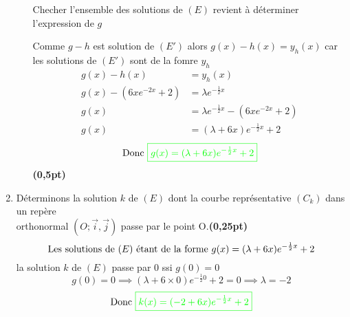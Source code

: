 \documentclass[12pt]{article}
\begin{document}
\begin{enumerate}[label=\arabic*)]
\begin{enumerate}[label=\alph*)]
Checher l'ensemble des solutions de \( (E) \) revient à déterminer l'expression de \( g \)

Comme \( g-h \) est solution  de \( (E') \) alors \( g(x)-h(x)= y_{h}(x) \) car les solutions de \( (E') \) sont de la fomre \( y_{h} \)
\begin{align*}
g(x)-h(x)&= y_{h}(x)\\
g(x) - (6xe^{-2x}+2) &= \lambda e^{-\frac{1}{2}x}\\
g(x)&= \lambda e^{-\frac{1}{2}x}- (6xe^{-2x}+2)\\
g(x)&= (\lambda + 6x)e^{-\frac{1}{2}x}+2
\end{align*}
\[\text{Donc } \textcolor{green}{\boxed{ g(x)= (\lambda + 6x)e^{-\frac{1}{2}x}+2 }} \]\hfill \textbf{(0,5pt)}
    \end{enumerate}
    \item Déterminons la solution $k$ de $(E)$ dont la courbe représentative $(C_{k})$ dans un repère\\ orthonormal $(O;\vec{i},\vec{j})$ passe par le point O.\hfill \textbf{(0,25pt)}
    \[\text{Les solutions de  \( (E) \) étant de la forme } g(x)= (\lambda + 6x)e^{-\frac{1}{2}x}+2 \]
    la solution $k$ de $(E)$ passe par 0 ssi \( g(0)=0 \)
    \[ g(0) = 0 \implies (\lambda + 6\times 0)e^{-\frac{1}{2}0}+2 = 0 \implies \lambda = -2 \]
    \[\text{Donc } \textcolor{green}{\boxed{ k(x)= (-2 + 6x)e^{-\frac{1}{2}x}+2 }} \]
\end{enumerate}
\end{document}
